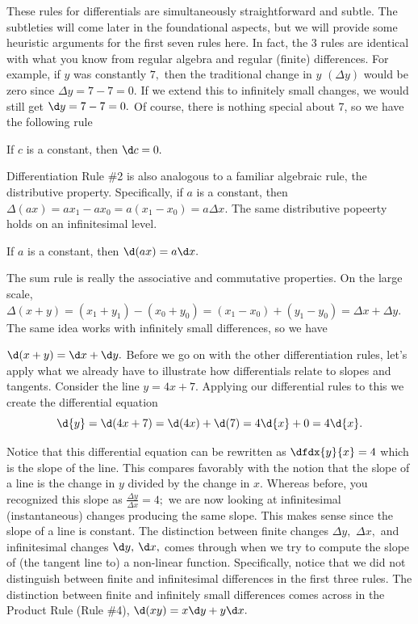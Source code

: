 These rules for differentials are simultaneously straightforward and
subtle.  The subtleties will come later in the foundational aspects,
but we will provide some heuristic arguments for the first seven rules
here.  In fact, the 3 rules are identical with what you know from
regular algebra and regular (finite) differences.  For example, if $y$ 
was constantly $7,$ then the traditional change in $y$  $(\Delta y)$ would be zero
since $\Delta y=7-7=0.$  If we extend this to infinitely small changes, we
would still get $\d y=7-7=0.$  Of course, there is nothing special about
7, so we have the following rule

  If $c$ is a constant, then $\d c=0.$
	
Differentiation Rule \#2 is also analogous to a familiar algebraic
rule, the distributive property.  Specifically, if $a$ is a constant,
then $\Delta(ax)=ax_1-ax_0=a(x_1-x_0)=a\Delta x.$  The same distributive popeerty
holds on an infinitesimal level.

  If $a$ is a constant, then $\d(ax)=a\d x.$ 

The sum rule is really the associative and commutative properties.  On
the large scale, $\Delta(x+y)=(x_1+y_1)-(x_0+y_0)=(x_1-x_0)+(y_1-y_0)=\Delta x+\Delta y.$  The same idea works with infinitely small differences, so we
have

  $\d(x+y)=\d x+\d y.$
Before we go on with the other differentiation rules, let's apply what
we already have to illustrate how differentials relate to slopes and
tangents.  Consider the line $y=4x+7.$ Applying our differential rules
to this we create the differential equation 
$$
\d{y}=\d(4x+7)=\d(4x)+\d(7)=4\d{x}+0=4\d{x}.
$$

Notice that this differential equation can be rewritten as
$\dfdx{y}{x}=4$ which is
the slope of the line.  This compares favorably with the notion that
the slope of a line is the change in $y$ divided by the change in $x.$
Whereas before, you recognized this slope as $\frac{\Delta{}y}{\Delta{}x}=4;$ we are now looking at
infinitesimal (instantaneous) changes producing the same slope.  This
makes sense since the slope of a line is constant.  The distinction
between finite changes $\Delta y,$ $\Delta x,$ and infinitesimal
changes $\d y,$ $\d x,$ comes through when
we try to compute the slope of (the tangent line to) a non-linear
function.  Specifically, notice that we did not distinguish between
finite and infinitesimal differences in the first three rules.  The
distinction between finite and infinitely small differences comes
across in the Product Rule (Rule \#4), $\d(xy)=x\d y+y\d x.$

